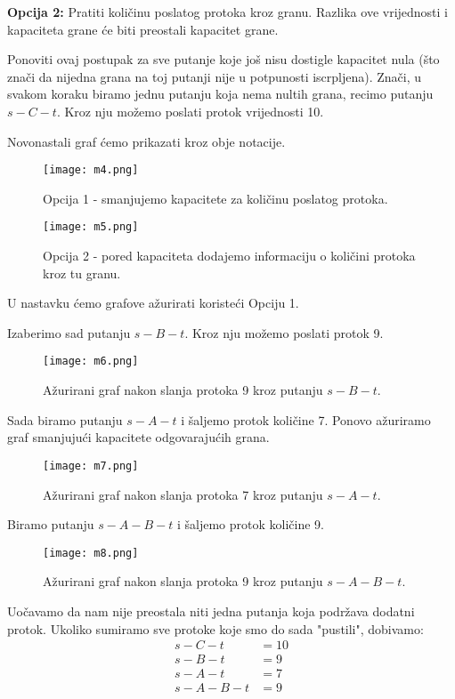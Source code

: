 \documentclass[11pt, a4paper]{article}
\begin{document}
	\textbf{Opcija 2:} Pratiti količinu poslatog protoka kroz granu. Razlika ove vrijednosti i kapaciteta grane će biti preostali kapacitet grane.
	
	Ponoviti ovaj postupak za sve putanje koje još nisu dostigle kapacitet nula (što znači da nijedna grana na toj putanji nije u potpunosti iscrpljena). Znači, u svakom koraku biramo jednu putanju koja nema nultih grana, recimo putanju $s-C-t$. Kroz nju možemo poslati protok vrijednosti 10.
	
	Novonastali graf ćemo prikazati kroz obje notacije.
	
	\begin{figure}[h]
		\centering
		\texttt{[image: m4.png]}
		\caption{Opcija 1 - smanjujemo kapacitete za količinu poslatog protoka.}
		\label{fig:m4}
	\end{figure}
	
	\begin{figure}[h]
		\centering
		\texttt{[image: m5.png]}
		\caption{Opcija 2 - pored kapaciteta dodajemo informaciju o količini protoka kroz tu granu.}
		\label{fig:m5}
	\end{figure}
	
	U nastavku ćemo grafove ažurirati koristeći Opciju 1.
	
	Izaberimo sad putanju $s-B-t$. Kroz nju možemo poslati protok 9.
	\begin{figure}[h]
		\centering
		\texttt{[image: m6.png]}
		\caption{Ažurirani graf nakon slanja protoka 9 kroz putanju $s-B-t$.}
		\label{fig:m6}
	\end{figure}
	
	\pagebreak
	Sada biramo putanju $s-A-t$ i šaljemo protok količine 7. Ponovo ažuriramo graf smanjujući kapacitete odgovarajućih grana.
	\begin{figure}[h]
		\centering
		\texttt{[image: m7.png]}
		\caption{Ažurirani graf nakon slanja protoka 7 kroz putanju $s-A-t$.}
		\label{fig:m7}
	\end{figure}
	
	Biramo putanju $s-A-B-t$ i šaljemo protok količine 9.
	\begin{figure}[h]
		\centering
		\texttt{[image: m8.png]}
		\caption{Ažurirani graf nakon slanja protoka 9 kroz putanju $s-A-B-t$.}
		\label{fig:m8}
	\end{figure}
	
	Uočavamo da nam nije preostala niti jedna putanja koja podržava dodatni protok. Ukoliko sumiramo sve protoke koje smo do sada "pustili", dobivamo:
	\begin{align*}
		s-C-t &= 10\\
		s-B-t &= 9\\
		s-A-t &= 7\\
		s-A-B-t &= 9
	\end{align*}
	
\end{document}
